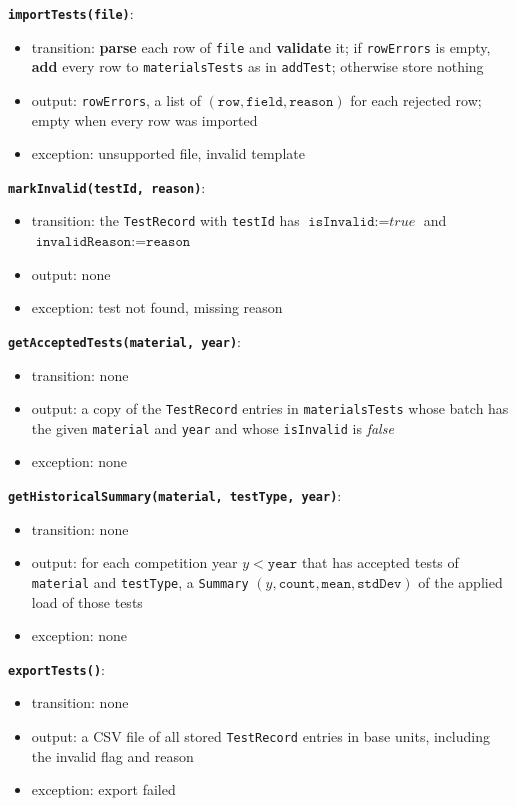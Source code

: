 \documentclass[12pt, titlepage]{article}
\begin{document}
\textbf{\texttt{importTests(file)}}:
\begin{itemize}
  \item transition: \textbf{parse} each row of \texttt{file} and \textbf{validate} it; if \texttt{rowErrors} is empty, \textbf{add} every row to \texttt{materialsTests} as in \texttt{addTest}; otherwise store nothing
  \item output: \texttt{rowErrors}, a list of $(\texttt{row}, \texttt{field}, \texttt{reason})$ for each rejected row; empty when every row was imported
  \item exception: unsupported file, invalid template
\end{itemize}

\textbf{\texttt{markInvalid(testId, reason)}}:
\begin{itemize}
  \item transition: the \texttt{TestRecord} with \texttt{testId} has $\texttt{isInvalid} := \textit{true}$ and $\texttt{invalidReason} := \texttt{reason}$
  \item output: none
  \item exception: test not found, missing reason
\end{itemize}

\textbf{\texttt{getAcceptedTests(material, year)}}:
\begin{itemize}
  \item transition: none
  \item output: a copy of the \texttt{TestRecord} entries in \texttt{materialsTests} whose batch has the given \texttt{material} and \texttt{year} and whose \texttt{isInvalid} is \textit{false}
  \item exception: none
\end{itemize}

\textbf{\texttt{getHistoricalSummary(material, testType, year)}}:
\begin{itemize}
  \item transition: none
  \item output: for each competition year $y < \texttt{year}$ that has accepted tests of \texttt{material} and \texttt{testType}, a \texttt{Summary} $(y, \texttt{count}, \texttt{mean}, \texttt{stdDev})$ of the applied load of those tests
  \item exception: none
\end{itemize}

\textbf{\texttt{exportTests()}}:
\begin{itemize}
  \item transition: none
  \item output: a CSV file of all stored \texttt{TestRecord} entries in base units, including the invalid flag and reason
  \item exception: export failed
\end{itemize}
\end{document}
